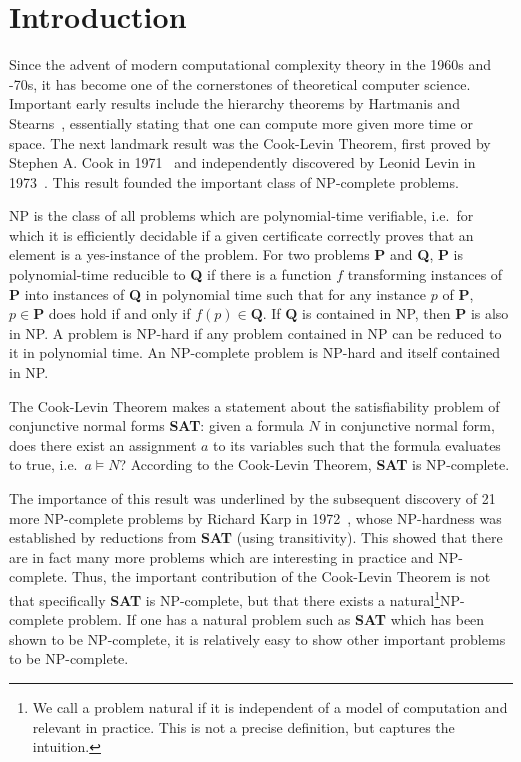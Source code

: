 \chapter{Introduction}\label{chap:introduction} 
\newcommand{\SAT}{\normalfont\textbf{SAT}}
\newcommand{\Clique}{\normalfont\textbf{Clique}}
\newcommand{\NP}{\textsf{NP}}
\newcommand{\PC}{\textsf{P}}

\newcommand{\PR}{\normalfont\textbf{PR}}

Since the advent of modern computational complexity theory in the 1960s and -70s, it has become one of the cornerstones of theoretical computer science. 
Important early results include the hierarchy theorems by Hartmanis and Stearns~\cite{hartmanis_stearns}, essentially stating that one can compute more given more time or space. 
The next landmark result was the Cook-Levin Theorem, first proved by Stephen A. Cook in 1971~\cite{cook_theorem} and independently discovered by Leonid Levin in 1973~\cite{levin_theorem}. 
This result founded the important class of \NP{}-complete problems. 

\NP{} is the class of all problems which are polynomial-time verifiable, i.e.\ for which it is efficiently decidable if a given certificate correctly proves that an element is a yes-instance of the problem. For two problems \textbf{P} and \textbf{Q}, \textbf{P} is polynomial-time reducible to \textbf{Q} if there is a function $f$ transforming instances of \textbf{P} into instances of \textbf{Q} in polynomial time such that for any instance $p$ of \textbf{P}, $p \in \textbf{P}$ does hold if and only if $f(p) \in \textbf{Q}$. 
If $\textbf{Q}$ is contained in \NP{}, then $\textbf{P}$ is also in \NP{}.
A problem is \NP{}-hard if any problem contained in \NP{} can be reduced to it in polynomial time. An \NP{}-complete problem is \NP{}-hard and itself contained in \NP{}.  

The Cook-Levin Theorem makes a statement about the satisfiability problem of conjunctive normal forms \SAT{}: 
given a formula $N$ in conjunctive normal form, does there exist an assignment $a$ to its variables such that the formula evaluates to \textsf{true}, i.e.\ $a \models N$?
According to the Cook-Levin Theorem, \SAT{} is \NP{}-complete. 

The importance of this result was underlined by the subsequent discovery of 21 more \NP{}-complete problems by Richard Karp in 1972~\cite{Karp1972}, whose \NP{}-hardness was established by reductions from \textbf{SAT} (using transitivity). This showed that there are in fact many more problems which are interesting in practice and \NP{}-complete. 
Thus, the important contribution of the Cook-Levin Theorem is not that specifically \SAT{} is \NP{}-complete, but that there exists a natural\footnote{We call a problem natural if it is independent of a model of computation and relevant in practice. This is not a precise definition, but captures the intuition.}\NP{}-complete problem. If one has a natural problem such as \SAT{} which has been shown to be \NP{}-complete, it is relatively easy to show other important problems to be \NP{}-complete.

